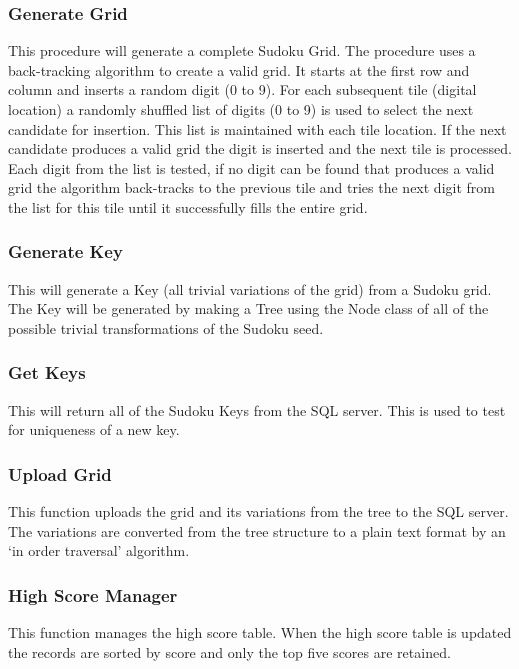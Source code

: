 \documentclass[fleqn]{article}
\begin{document}
\subsubsection{Generate Grid}
This procedure will generate a complete Sudoku Grid.
The procedure uses a back-tracking algorithm to create a valid grid. It starts at the first row and column and inserts a random digit (0 to 9). For each subsequent tile (digital location) a randomly shuffled list of digits (0 to 9) is used to select the next candidate for insertion. This list is maintained with each tile location. If the next candidate produces a valid grid the digit is inserted and the next tile is processed. Each digit from the list is tested, if no digit can be found that produces a valid grid the algorithm back-tracks to the previous tile and tries the next digit from the list for this tile until it successfully fills the entire grid. 

\subsubsection{Generate Key}
This will generate a Key (all trivial variations of the grid) from a Sudoku grid. The Key will be generated by making a Tree using the Node class of all of the possible trivial transformations of the Sudoku seed.

\subsubsection{Get Keys}
This will return all of the Sudoku Keys from the SQL server. This is used to test for uniqueness of a new key.

\subsubsection{Upload Grid}

This function uploads the grid and its variations from the tree to the SQL server. The variations are converted from the tree structure to a plain text format by an ‘in order traversal’ algorithm.

\subsubsection{High Score Manager}
This function manages the high score table. When the high score table is updated the records are sorted by score and only the top five scores are retained.
\end{document}
